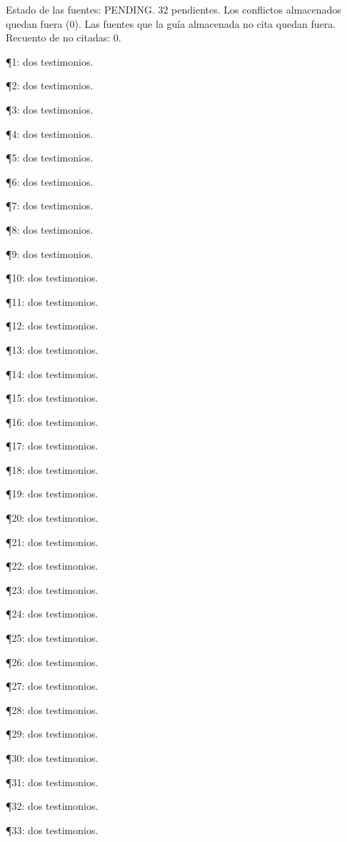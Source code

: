 \documentclass{book}
\begin{document}
\noindent Estado de las fuentes: PENDING. 32 pendientes. Los conflictos almacenados quedan fuera (0). Las fuentes que la guía almacenada no cita quedan fuera. Recuento de no citadas: 0.

\noindent ¶1: dos testimonios.

\noindent ¶2: dos testimonios.

\noindent ¶3: dos testimonios.

\noindent ¶4: dos testimonios.

\noindent ¶5: dos testimonios.

\noindent ¶6: dos testimonios.

\noindent ¶7: dos testimonios.

\noindent ¶8: dos testimonios.

\noindent ¶9: dos testimonios.

\noindent ¶10: dos testimonios.

\noindent ¶11: dos testimonios.

\noindent ¶12: dos testimonios.

\noindent ¶13: dos testimonios.

\noindent ¶14: dos testimonios.

\noindent ¶15: dos testimonios.

\noindent ¶16: dos testimonios.

\noindent ¶17: dos testimonios.

\noindent ¶18: dos testimonios.

\noindent ¶19: dos testimonios.

\noindent ¶20: dos testimonios.

\noindent ¶21: dos testimonios.

\noindent ¶22: dos testimonios.

\noindent ¶23: dos testimonios.

\noindent ¶24: dos testimonios.

\noindent ¶25: dos testimonios.

\noindent ¶26: dos testimonios.

\noindent ¶27: dos testimonios.

\noindent ¶28: dos testimonios.

\noindent ¶29: dos testimonios.

\noindent ¶30: dos testimonios.

\noindent ¶31: dos testimonios.

\noindent ¶32: dos testimonios.

\noindent ¶33: dos testimonios.
\end{document}
